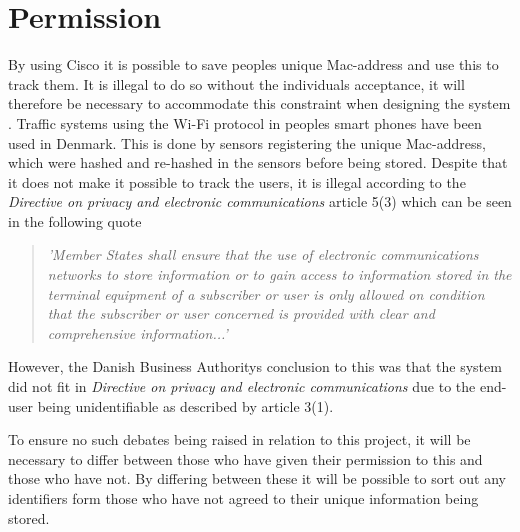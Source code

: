 \section{Permission}
By using Cisco it is possible to save peoples unique Mac-address and use this to track them. It is illegal to do so without the individuals acceptance, it will therefore be necessary to accommodate this constraint when designing the system \cite{TrafficIlligal}.
Traffic systems using the Wi-Fi protocol in peoples smart phones have been used in Denmark. This is done by sensors registering the unique Mac-address, which were hashed and re-hashed in the sensors before being stored. Despite that it does not make it possible to track the users\cite{TrafficIligal}, it is illegal according to the \textit{Directive on privacy and electronic communications} article 5(3)\cite{CookieDirective} which can be seen in the following quote

\begin{quote}
\textit{'Member States shall ensure that the use of electronic communications networks to store information or to gain access to information stored in the terminal equipment of a subscriber or user is only allowed on condition that the subscriber or user concerned is provided with clear and comprehensive information...'}
\end{quote}

However, the Danish Business Authoritys conclusion to this was that the system did not fit in \textit{Directive on privacy and electronic communications} due to the end-user being unidentifiable\cite{TrafficOK} as described by article 3(1)\cite{CookieDirective}.

To ensure no such debates being raised in relation to this project, it will be necessary to differ between those who have given their permission to this and those who have not. By differing between these it will be possible to sort out any identifiers form those who have not agreed to their unique information being stored.
